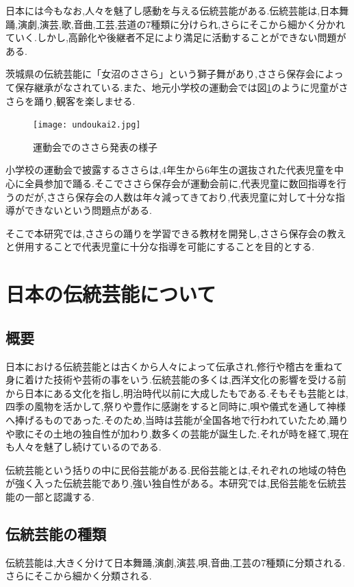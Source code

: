 \documentclass[12pt]{ltjsarticle}
\begin{document}

日本には今もなお,人々を魅了し感動を与える伝統芸能がある.伝統芸能は,日本舞踊,演劇,演芸,歌,音曲,工芸,芸道の7種類に分けられ,さらにそこから細かく分かれていく.しかし,高齢化や後継者不足により満足に活動することができない問題がある.

茨城県の伝統芸能に「女沼のささら」という獅子舞があり,ささら保存会によって保存継承がなされている.また、地元小学校の運動会では図\ref{fig:運動会}のように児童がささらを踊り,観客を楽しませる.
\begin{figure}[h]
\begin{center}
 \texttt{[image: undoukai2.jpg]}
\end{center}
 \caption{運動会でのささら発表の様子}
 \label{fig:運動会}
\end{figure}


小学校の運動会で披露するささらは,4年生から6年生の選抜された代表児童を中心に全員参加で踊る.そこでささら保存会が運動会前に,代表児童に数回指導を行うのだが,ささら保存会の人数は年々減ってきており,代表児童に対して十分な指導ができないという問題点がある.

そこで本研究では,ささらの踊りを学習できる教材を開発し,ささら保存会の教えと併用することで代表児童に十分な指導を可能にすることを目的とする.

\newpage
\section{日本の伝統芸能について}

\subsection{概要}
日本における伝統芸能とは古くから人々によって伝承され,修行や稽古を重ねて身に着けた技術や芸術の事をいう.伝統芸能の多くは,西洋文化の影響を受ける前から日本にある文化を指し,明治時代以前に大成したもである.そもそも芸能とは,四季の風物を活かして,祭りや豊作に感謝をすると同時に,唄や儀式を通して神様へ捧げるものであった.そのため,当時は芸能が全国各地で行われていたため,踊りや歌にその土地の独自性が加わり,数多くの芸能が誕生した.それが時を経て,現在も人々を魅了し続けているのである.

伝統芸能という括りの中に民俗芸能がある.民俗芸能とは,それぞれの地域の特色が強く入った伝統芸能であり,強い独自性がある。本研究では,民俗芸能を伝統芸能の一部と認識する.

\subsection{伝統芸能の種類}
伝統芸能は,大きく分けて日本舞踊,演劇,演芸,唄,音曲,工芸の7種類に分類される.さらにそこから細かく分類される.
\end{document}
